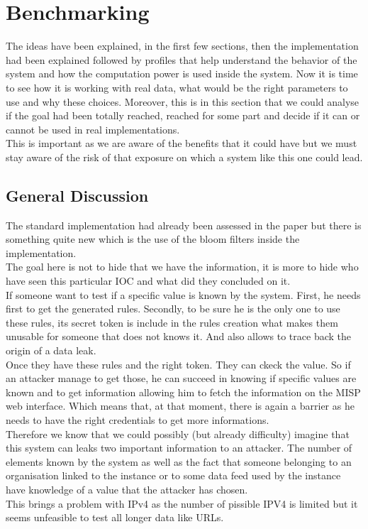 \documentclass{eplmastersthesis}
\begin{document}
\section{Benchmarking}
The ideas have been explained, in the first few sections, then the implementation had been explained followed by profiles that help understand the behavior of the system and how the computation power is used inside the system. Now it is time to see how it is working with real data, what would be the right parameters to use and why these choices. Moreover, this is in this section that we could analyse if the goal had been totally reached, reached for some part and decide if it can or cannot be used in real implementations.\\
This is important as we are aware of the benefits that it could have but we must stay aware of the risk of that exposure on which a system like this one could lead.\\


\subsection{General Discussion}
The standard implementation had already been assessed in the paper  but there is something quite new which is the use of the bloom filters inside the implementation.\\
The goal here is not to hide that we have the information, it is more to hide who have seen this particular IOC and what did they concluded on it.\\
If someone want to test if a specific value is known by the system. First, he needs first to get the generated rules. Secondly, to be sure he is the only one to use these rules, its secret token is include in the rules creation what makes them unusable for someone that does not knows it. And also allows to trace back the origin of a data leak.\\
Once they have these rules and the right token. They can ckeck the value. So if an attacker manage to get those, he can succeed in knowing if specific values are known and to get information allowing him to fetch the information on the MISP web interface. Which means that, at that moment, there is again a barrier as he needs to have the right credentials to get more informations.\\

Therefore we know that we could possibly (but already difficulty) imagine that this system can leaks two important information to an attacker. The number of elements known by the system as well as the fact that someone belonging to an organisation linked to the instance or to some data feed used by the instance have knowledge of a value that the attacker has chosen.\\
This brings a problem with IPv4 as the number of pissible IPV4 is limited but it seems unfeasible to test all longer data like URLs.\\
\end{document}
